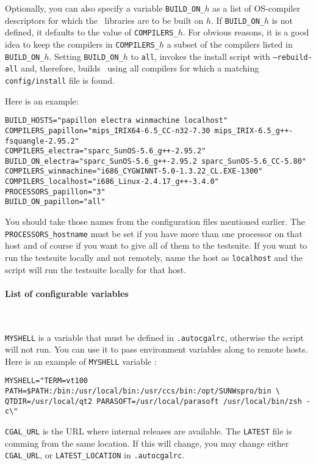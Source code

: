 Optionally, you can also specify a variable \texttt{BUILD\_ON\_$h$} as
a list of OS-compiler descriptors for which the \cgal\ libraries are
to be built on $h$. If \texttt{BUILD\_ON\_$h$} is not defined, it
defaults to the value of \texttt{COMPILERS\_$h$}. For obvious reasons,
it is a good idea to keep the compilers in \texttt{COMPILERS\_$h$} a
subset of the compilers listed in \texttt{BUILD\_ON\_$h$}. Setting
\texttt{BUILD\_ON\_$h$} to \texttt{all}, invokes the install script
with \texttt{--rebuild-all} and, therefore, builds \cgal\ using all
compilers for which a matching \texttt{config/install} file is found.

\noindent Here is an example:
\begingroup\small
\begin{verbatim}
BUILD_HOSTS="papillon electra winmachine localhost"
COMPILERS_papillon="mips_IRIX64-6.5_CC-n32-7.30 mips_IRIX-6.5_g++-fsquangle-2.95.2"
COMPILERS_electra="sparc_SunOS-5.6_g++-2.95.2"
BUILD_ON_electra="sparc_SunOS-5.6_g++-2.95.2 sparc_SunOS-5.6_CC-5.80"
COMPILERS_winmachine="i686_CYGWINNT-5.0-1.3.22_CL.EXE-1300"
COMPILERS_localhost="i686_Linux-2.4.17_g++-3.4.0"
PROCESSORS_papillon="3" 
BUILD_ON_papillon="all"
\end{verbatim}\endgroup
You should take those names from the configuration files mentioned
earlier. The {\tt PROCESSORS\_hostname} must be set if you have more
than one processor on that host and of course if you want to give all
of them to the testsuite. If you want to run the testsuite locally and
not remotely, name the host as {\tt localhost} and the script will run
the testsuite locally for that host.

\paragraph{List of configurable variables} ~

{\tt MYSHELL} is a variable that must be defined in {\tt .autocgalrc},
otherwise the script will not run.  You can use it to pass environment
variables along to remote hosts.  Here is an example of {\tt MYSHELL}
variable :
\begin{verbatim}
MYSHELL="TERM=vt100 PATH=$PATH:/bin:/usr/local/bin:/usr/ccs/bin:/opt/SUNWspro/bin \
QTDIR=/usr/local/qt2 PARASOFT=/usr/local/parasoft /usr/local/bin/zsh -c\"
\end{verbatim}

{\tt CGAL\_URL} is the URL where internal releases are available.
The {\tt LATEST} file is comming from the same location. If this will change,
you may change either {\tt CGAL\_URL}, or {\tt LATEST\_LOCATION}
in {\tt .autocgalrc}.


